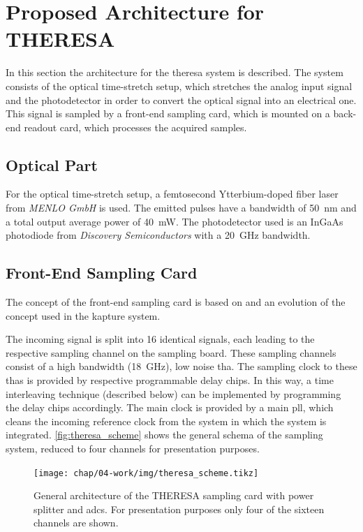 \section{Proposed Architecture for THERESA}
In this section the architecture for the \gls{theresa} system is described.
The system consists of the optical time-stretch setup, which stretches the analog input signal and the photodetector in order to convert the optical signal into an electrical one.
This signal is sampled by a front-end sampling card, which is mounted on a back-end readout card, which processes the acquired samples.

\subsection*{Optical Part}
For the optical time-stretch setup, a femtosecond Ytterbium-doped fiber laser from \textit{MENLO GmbH} is used. The emitted pulses have a bandwidth of \SI{50}{\nano \meter} and a total output average power of \SI{40}{\milli \watt}.
The photodetector used is an InGaAs photodiode from \textit{Discovery Semiconductors} with a \SI{20}{\GHz} bandwidth.

\subsection{Front-End Sampling Card}
The concept of the front-end sampling card is based on and an evolution of the concept used in the \gls{kapture} system. 

The incoming signal is split into 16 identical signals, each leading to the respective sampling channel on the sampling board.
These sampling channels consist of a high bandwidth (\SI{18}{\GHz}), low noise \gls{tha}. %
The sampling clock to these \glspl{tha} is provided by respective programmable delay chips.
In this way, a time interleaving technique (described below) can be implemented by programming the delay chips accordingly. 
The main clock is provided by a main \gls{pll}, which cleans the incoming reference clock from the system in which the system is integrated.
\autoref{fig:theresa_scheme} shows the general schema of the sampling system, reduced to four channels for presentation purposes.
\begin{figure}[H]
	\centering
	\texttt{[image: chap/04-work/img/theresa\_scheme.tikz]}
	\caption[General architecture of the THERESA sampling card]{General architecture of the THERESA sampling card with power splitter and \glspl{adc}. For presentation purposes only four of the sixteen channels are shown.}
	\label{fig:theresa_scheme}
\end{figure}

